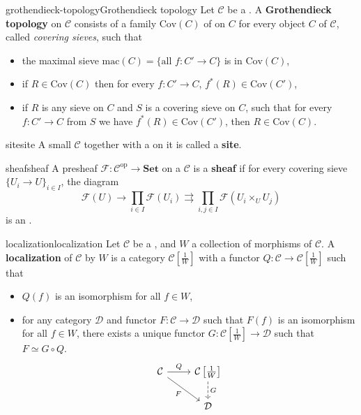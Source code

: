 \begin{topic}{grothendieck-topology}{Grothendieck topology}
    Let $\mathcal{C}$ be a . A \textbf{Grothendieck topology} on $\mathcal{C}$ consists of a family $\text{Cov}(C)$ of  on $C$ for every object $C$ of $\mathcal{C}$, called \textit{covering sieves}, such that
    \begin{itemize}
        \item the maximal sieve $\text{mac}(C) = \{ \text{all } f : C' \to C \}$ is in $\text{Cov}(C)$,
        \item if $R \in \text{Cov}(C)$ then for every $f : C' \to C$, $f^*(R) \in \text{Cov}(C')$,
        \item if $R$ is any sieve on $C$ and $S$ is a covering sieve on $C$, such that for every $f : C' \to C$ from $S$ we have $f^*(R) \in \text{Cov}(C')$, then $R \in \text{Cov}(C)$.
    \end{itemize}
\end{topic}

\begin{topic}{site}{site}
    A small  $\mathcal{C}$ together with a  on it is called a \textbf{site}.
\end{topic}

\begin{topic}{sheaf}{sheaf}
    A presheaf $\mathcal{F} : \mathcal{C}^\text{op} \to \textbf{Set}$ on a  $\mathcal{C}$ is a \textbf{sheaf} if for every covering sieve $\{ U_i \to U \}_{i \in I}$, the diagram
    \[ \mathcal{F}(U) \to \prod_{i \in I} \mathcal{F}(U_i) \rightrightarrows \prod_{i, j \in I} \mathcal{F}(U_i \times_U U_j) \]
    is an .
\end{topic}

\begin{topic}{localization}{localization}
    Let $\mathcal{C}$ be a , and $W$ a collection of morphisms of $\mathcal{C}$. A \textbf{localization} of $\mathcal{C}$ by $W$ is a category $\mathcal{C}\left[\frac{1}{W}\right]$ with a functor $Q : \mathcal{C} \to \mathcal{C}\left[\frac{1}{W}\right]$ such that
    \begin{itemize}
        \item $Q(f)$ is an isomorphism for all $f \in W$,
        \item for any category $\mathcal{D}$ and functor $F : \mathcal{C} \to \mathcal{D}$ such that $F(f)$ is an isomorphism for all $f \in W$, there exists a unique functor $G : \mathcal{C}\left[\frac{1}{W}\right] \to \mathcal{D}$ such that $F \simeq G \circ Q$.
        \[ \begin{tikzcd} \mathcal{C} \arrow{r}{Q} \arrow[swap]{rd}{F} & \mathcal{C}\left[\frac{1}{W}\right] \arrow[dashed]{d}{G} \\ & \mathcal{D} \end{tikzcd} \]
    \end{itemize}
\end{topic}

